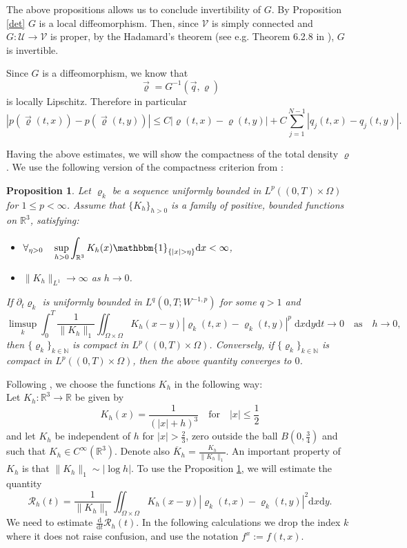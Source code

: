 \documentclass[11pt]{article}
\newcommand{\dd}{\mathrm{d}}
\newtheorem{prop}[tw]{Proposition}
\numberwithin{equation}{section}
\numberwithin{tw}{section}
\begin{document}
The above propositions allows us to conclude invertibility of $G$. By Proposition \ref{det} $G$ is a local diffeomorphism. Then, since $\mathcal{V}$ is simply connected and $G\colon\mathcal{U}\to\mathcal{V}$ is proper, by the Hadamard's theorem (see e.g. Theorem 6.2.8 in \cite{implicit_book}), $G$ is invertible.

Since $G$ is a diffeomorphism, we know that
\[ \vec\varrho = G^{-1}(\vec q,\varrho) \]
is locally Lipschitz. Therefore in particular
\begin{equation}\label{p_lip} |p(\vec\varrho(t,x))-p(\vec\varrho(t,y))| \leq C|\varrho(t,x)-\varrho(t,y)| + C\sum_{j=1}^{N-1}|q_j(t,x)-q_j(t,y)|. \end{equation}

Having the above estimates, we will show the compactness of the total density $\varrho$. We use the following version of the compactness criterion from \cite{bresch-jabin,BJ2}:

\begin{prop}\label{BJ}
Let $\varrho_k$ be a sequence uniformly bounded in $L^p((0,T)\times\Omega)$ for $1\leq p<\infty$. Assume that $\{K_h\}_{h>0}$ is a family of positive, bounded functions on $\mathbb{R}^3$, satisfying:
\begin{itemize}
    \item $\displaystyle \forall_{\eta>0} \quad \sup_{h>0}\int_{\mathbb{R}^3} K_h(x)\mathbbm{1}_{\{|x|>\eta\}}\dd x <\infty$,
    \item $\|K_h\|_{L^1}\to \infty$ as $h\to 0$.
    \end{itemize}
    If $\partial_t\varrho_k$ is uniformly bounded in $L^q(0,T;W^{-1,p})$ for some $q>1$ and
    \[ \limsup_k\int_0^T\frac{1}{\|K_h\|_1}\iint_{\Omega\times\Omega} K_h(x-y)|\varrho_k(t,x)-\varrho_k(t,y)|^p\; \dd x\dd y\dd t \to 0 \quad \text{as} \quad h\to 0, \]
    then $\{\varrho_k\}_{k\in\mathbb{N}}$ is compact in $L^p((0,T)\times\Omega)$. Conversely, if $\{\varrho_k\}_{k\in\mathbb{N}}$ is compact in $L^p((0,T)\times\Omega)$, then the above quantity converges to $0$.
\end{prop}

Following \cite{bresch-jabin}, we choose the functions $K_h$ in the following way: \\
Let $K_h\colon \mathbb{R}^3\to\mathbb{R}$ be given by
\[ K_h(x) = \frac{1}{(|x|+h)^3} \quad \text{for} \quad |x|\leq\frac{1}{2} \]
 and let $K_h$ be independent of $h$ for $|x|>\frac{2}{3}$, zero outside the ball $B(0,\frac{3}{4})$ and such that $K_h\in C^\infty(\mathbb{R}^3)$. Denote also $\overline{K}_h=\frac{K_h}{\|K_h\|_1}$. An important property of $K_h$ is that $\|K_h\|_1 \sim |\log h|$.
To use the Proposition \ref{BJ}, we will estimate the quantity
\[ \mathcal{R}_h(t) = \frac{1}{\|K_h\|_1}\iint_{\Omega\times\Omega} K_h(x-y)|\varrho_{k}(t,x)-\varrho_{k}(t,y)|^2\dd x\dd y. \]
We need to estimate $\frac{\dd}{\dd t}\mathcal{R}_h(t)$. In the following calculations we drop the index $k$ where it does not raise confusion, and use the notation $f^x:= f(t,x)$. 
\end{document}
